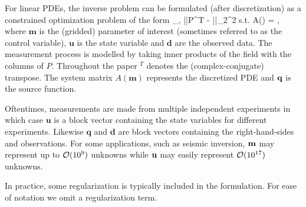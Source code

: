 \documentclass{iopart}
\begin{document}
For linear PDEs, the inverse problem can be formulated (after discretization) as a constrained optimization problem of the form
\bq
\label{eq:constr}
\min_{,} ||P^T - ||_2^2 \quad 
\mbox{s.t.} \quad A() = ,
\eq
where $\mathbf{m}$ is the (gridded) parameter of interest (sometimes referred to as the control variable), $\mathbf{u}$ is the state variable and $\mathbf{d}$ are
the observed data. The measurement process is modelled by taking inner products of the field with the columns of $P$. 
Throughout the paper $^T$ denotes the (complex-conjugate) transpose. The system matrix $A(\mathbf{m})$ 
represents the discretized PDE and $\mathbf{q}$ is the source function. 

Oftentimes, measurements are made from multiple independent experiments
in which case $\mathbf{u}$ is a block vector containing the state variables for different experiments. 
Likewise $\mathbf{q}$ and $\mathbf{d}$ are block vectors containing the right-hand-sides and observations.
For some applications, such as seismic inversion, $\mathbf{m}$ may represent up to $\mathcal{O}(10^9)$ unknowns 
while $\mathbf{u}$ may easily represent $\mathcal{O}(10^{17})$ unknowns.

In practice, some regularization is typically included in the formulation. For ease of notation we omit a regularization term.
\end{document}

